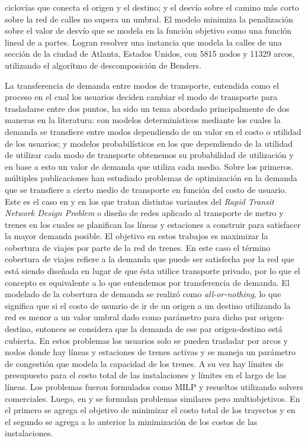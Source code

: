 ciclovías que conecta el origen y el destino; y el desvío sobre el camino más corto sobre la red de calles no supera un umbral. El modelo minimiza la penalización sobre el valor de desvío que se modela en la función objetivo como una función lineal de a partes. Logran resolver una instancia que modela la calles de una sección de la ciudad de Atlanta, Estados Unidos, con 5815 nodos y 11329 arcos, utilizando el algorítmo de descomposición de Benders.


  La transferencia de demanda entre modos de transporte, entendida como el proceso en el cual los usuarios deciden cambiar el modo de transporte para trasladarse entre dos puntos, ha sido un tema abordado principalmente de dos maneras en la literatura: con modelos determinísticos mediante los cuales la demanda se transfiere entre modos dependiendo de un valor en el costo o utilidad de los usuarios; y modelos probabilísticos en los que dependiendo de la utilidad de utilizar cada modo de transporte obtenemos su probabilidad de utilización y en base a esto un valor de demanda que utiliza cada medio. Sobre los primeros. múltiples publicaciones han estudiado problemas de optimización en la demanda que se transfiere a cierto medio de transporte en función del costo de usuario. Este es el caso en \cite{garcia2005} y \cite{laporte2007} en los que tratan distintas variantes del {\it Rapid Transit Network Design Problem} o diseño de redes aplicado al transporte de metro y trenes en los cuales se planifican las líneas y estaciones a construir para satisfacer la mayor demanda posible. El objetivo en estos trabajos es maximizar la cobertura de viajes por parte de la red de trenes. En este caso el término cobertura de viajes refiere a la demanda que puede ser satisfecha por la red que está siendo diseñada en lugar de que ésta utilice transporte privado, por lo que el concepto es equivalente a lo que entendemos por transferencia de demanda. El modelado de la cobertura de demanda se realizó como {\it all-or-nothing}, lo que significa que si el costo de usuario de ir de un origen a un destino utilizando la red es menor a un valor umbral dado como parámetro para dicho par origen-destino, entonces se considera que la demanda de ese par origen-destino está cubierta. En estos problemas los usuarios solo se pueden trasladar por arcos y nodos donde hay líneas y estaciones de trenes activas y se maneja un parámetro de congestión que modela la capacidad de los trenes. A su vez hay límites de presupuesto para el costo total de las instalaciones y límites en el largo de las líneas. Los problemas fueron formulados como MILP y resueltos utilizando solvers comerciales. Luego, en \cite{marin2007} y \cite{cadarso2015} se formulan problemas similares pero multiobjetivos. En el primero se agrega el objetivo de minimizar el costo total de los trayectos y en el segundo se agrega a lo anterior la minimización de los costos de las instalaciones.

